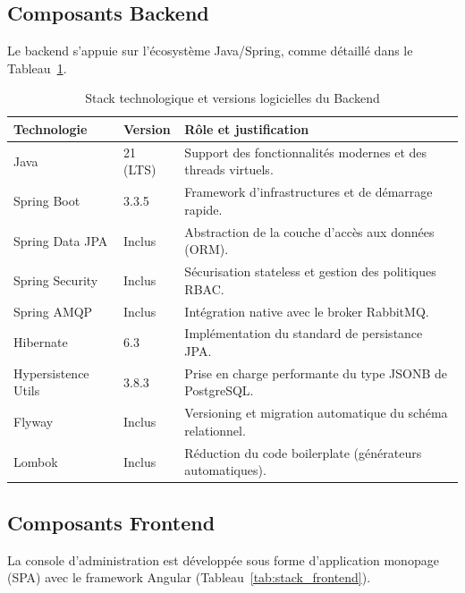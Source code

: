 \subsection{Composants Backend}
Le backend s'appuie sur l'écosystème Java/Spring, comme détaillé dans le Tableau~\ref{tab:stack_backend}.

\begin{table}[H]
    \centering
    \caption{Stack technologique et versions logicielles du Backend}
    \label{tab:stack_backend}
    \begin{tabular}{lll}
        \toprule
        \textbf{Technologie} & \textbf{Version} & \textbf{Rôle et justification} \\
        \midrule
        Java & 21 (LTS) & Support des fonctionnalités modernes et des threads virtuels. \\
        Spring Boot & 3.3.5 & Framework d'infrastructures et de démarrage rapide. \\
        Spring Data JPA & Inclus & Abstraction de la couche d'accès aux données (ORM). \\
        Spring Security & Inclus & Sécurisation stateless et gestion des politiques RBAC. \\
        Spring AMQP & Inclus & Intégration native avec le broker RabbitMQ. \\
        Hibernate & 6.3 & Implémentation du standard de persistance JPA. \\
        Hypersistence Utils & 3.8.3 & Prise en charge performante du type JSONB de PostgreSQL. \\
        Flyway & Inclus & Versioning et migration automatique du schéma relationnel. \\
        Lombok & Inclus & Réduction du code boilerplate (générateurs automatiques). \\
        \bottomrule
    \end{tabular}
\end{table}

\subsection{Composants Frontend}
La console d'administration est développée sous forme d'application monopage (SPA) avec le framework Angular (Tableau~\ref{tab:stack_frontend}).


